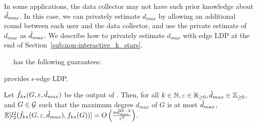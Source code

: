 In some applications, the data collector may not have such prior knowledge about $\tilde{d}_{max}$. 
In this case, we can 
privately estimate $d_{max}$ by allowing an additional round between each user and the data collector, and use the private estimate of $d_{max}$ as $\tilde{d}_{max}$. 
We describe how to privately estimate $d_{max}$ with edge LDP at the end of Section~\ref{sub:non-interactive_k_stars}. 



\smallskip
{}~~ 
has the following guarantees:

\begin{theorem}\label{thm:k-stars_LDP}
  provides $\epsilon$-edge LDP.
\end{theorem}

\begin{theorem}\label{thm:k-stars}
  Let
  $\hat{f}_{k\star}(G, \varepsilon, \tilde{d}_{max})$ 
  be the output of 
  . 
  Then, 
  for all 
  $k \in \mathbb{N},\varepsilon \in \mathbb{R}_{\ge0},\tilde{d}_{max} \in \mathbb{Z}_{\ge0}$, 
  and $G \in \mathcal{G}$
  such that the maximum degree $d_{max}$ of $G$ 
  is at most 
  $\tilde{d}_{max}$, 
  $\mathbb{E}[l_2^2(\hat{f}_{k\star}(G, \varepsilon, \tilde{d}_{max}), f_{k\star}(G))] = 
  O\left( \frac{n \tilde{d}_{max}^{2k-2}}{\varepsilon^2} \right)$. 
\end{theorem}

